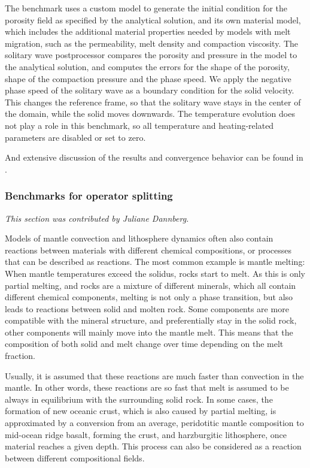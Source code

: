 \documentclass{article}
\begin{document}
The benchmark uses a custom model to generate the initial condition for the porosity field as specified by the analytical solution, and its own material model, which includes the additional material properties needed by models with melt migration, such as the permeability, melt density and compaction viscosity. The solitary wave postprocessor compares the porosity and pressure in the model to the analytical solution, and computes the errors for the shape of the porosity, shape of the compaction pressure and the phase speed. 
We apply the negative phase speed of the solitary wave as a boundary condition for the solid velocity. This changes the reference frame, so that the solitary wave stays in the center of the domain, while the solid moves downwards. The temperature evolution does not play a role in this benchmark, so all temperature and heating-related parameters are disabled or set to zero. 

And extensive discussion of the results and convergence behavior can be found in \cite{dannberg_melt}.

\subsubsection{Benchmarks for operator splitting}
\label{sec:benchmark-operator_splitting}

\textit{This section was contributed by Juliane Dannberg.}

Models of mantle convection and lithosphere dynamics often also contain reactions between materials with different chemical compositions, or processes that can be described as reactions. 
The most common example is mantle melting: When mantle temperatures exceed the solidus, rocks start to melt. As this is only partial melting, and rocks are a mixture of different minerals, which all contain different chemical components, melting is not only a phase transition, but also leads to reactions between solid and molten rock. Some components are more compatible with the mineral structure, and preferentially stay in the solid rock, other components will mainly move into the mantle melt. This means that the composition of both solid and melt change over time depending on the melt fraction. 

Usually, it is assumed that these reactions are much faster than convection in the mantle. In other words, these reactions are so fast that melt is assumed to be always in equilibrium with the surrounding solid rock. In some cases, the formation of new oceanic crust, which is also caused by partial melting, is approximated by a conversion from an average, peridotitic mantle composition to mid-ocean ridge basalt, forming the crust, and harzburgitic lithosphere, once material reaches a given depth. This process can also be considered as a reaction between different compositional fields. 
\end{document}
